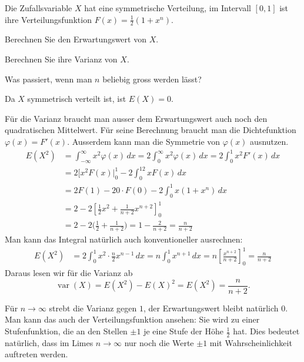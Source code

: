 Die Zufallsvariable $X$ hat eine symmetrische Verteilung, im
Intervall $[0,1]$ ist ihre Verteilungsfunktion $F(x)=\frac12(1+x^n)$.
\begin{teilaufgaben}
\item
Berechnen Sie den Erwartungswert von $X$.
\item
Berechnen Sie ihre Varianz von $X$.
\item
Was passiert, wenn man $n$ beliebig gross werden lässt?
\end{teilaufgaben}


\begin{loesung}
\begin{teilaufgaben}
\item Da $X$ symmetrisch verteilt ist, ist $E(X)=0$.
\item
Für die Varianz braucht man ausser dem Erwartungswert auch noch
den quadratischen Mittelwert.  Für seine Berechnung braucht man die
Dichtefunktion $\varphi(x)=F'(x)$. Ausserdem kann man die Symmetrie
von $\varphi(x)$ ausnutzen.
\begin{align*}
E(X^2)
&=
\int_{-\infty}^{\infty}x^2\varphi(x)\,dx
=
2\int_{0}^{\infty}x^2\varphi(x)\,dx
=2\int_0^1 x^2 F'(x)\,dx\\
&=
2[x^2F(x)|_0^1-2\int_0^12xF(x)\,dx
\\
&=
2F(1)-20\cdot F(0)-2\int_0^1x(1+x^n)\,dx
\\
&=
2-2\left[
\frac12x^2+\frac1{n+2}x^{n+2}
\right]_0^1
\\
&=
2-2\biggl(\frac12+\frac1{n+2}\biggr)
=
1-\frac{2}{n+2}
=
\frac{n}{n+2}
\end{align*}
Man kann das Integral natürlich auch konventioneller ausrechnen:
\begin{align*}
E(X^2)&=2\int_0^1x^2\cdot\frac{n}2x^{n-1}\,dx
=
n\int_0^1x^{n+1}\,dx=n\left[\frac{x^{n+2}}{n+2}\right]_0^1
=\frac{n}{n+2}
\end{align*}
Daraus lesen wir für die Varianz ab
\[
\operatorname{var}(X)=E(X^2)-E(X)^2=E(X^2)=\frac{n}{n+2}.
\]
\item
Für $n\to\infty$ strebt die Varianz gegen $1$, der Erwartungswert
bleibt natürlich $0$. Man kann das auch der Verteilungsfunktion
ansehen: Sie wird zu einer Stufenfunktion, die an den Stellen
$\pm 1$ je eine Stufe der Höhe $\frac12$ hat. Dies bedeutet
natürlich, dass im Limes $n\to\infty$ nur noch die Werte $\pm1$ mit
Wahrscheinlichkeit auftreten werden.
\qedhere
\end{teilaufgaben}
\end{loesung}

